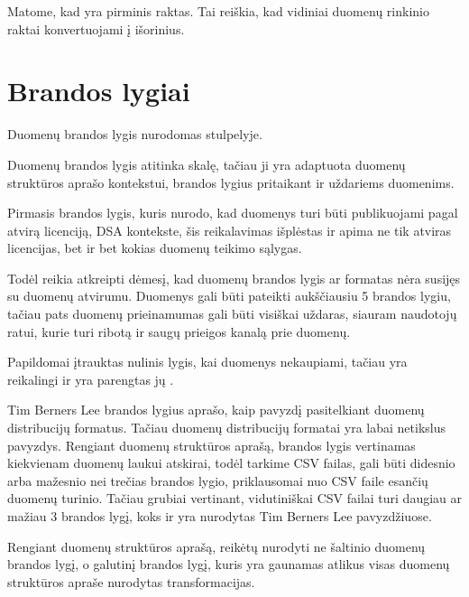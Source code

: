 \documentclass[letterpaper,10pt,lithuanian]{sphinxmanual}
\begin{document}
\sphinxAtStartPar
Matome, kad  yra  pirminis raktas. Tai reiškia, kad
vidiniai duomenų rinkinio raktai konvertuojami į išorinius.

\sphinxstepscope


\section{Brandos lygiai}
\label{\detokenize{branda:brandos-lygiai}}\label{\detokenize{branda:level}}\label{\detokenize{branda::doc}}
\sphinxAtStartPar
Duomenų brandos lygis nurodomas {\hyperref[\detokenize{formatas:level}]{}} stulpelyje.

\sphinxAtStartPar
Duomenų brandos lygis atitinka  skalę, tačiau ji yra adaptuota duomenų
struktūros aprašo kontekstui, brandos lygius pritaikant ir uždariems duomenims.

\sphinxAtStartPar
Pirmasis brandos lygis, kuris nurodo, kad duomenys turi būti publikuojami pagal
atvirą licenciją, DSA kontekste, šis reikalavimas išplėstas ir apima ne tik
atviras licencijas, bet ir bet kokias duomenų teikimo sąlygas.

\sphinxAtStartPar
Todėl reikia atkreipti dėmesį, kad duomenų brandos lygis ar formatas nėra
susijęs su duomenų atvirumu. Duomenys gali būti pateikti aukščiausiu 5 brandos
lygiu, tačiau pats duomenų prieinamumas gali būti visiškai uždaras, siauram
naudotojų ratui, kurie turi ribotą ir saugų prieigos kanalą prie duomenų.

\sphinxAtStartPar
Papildomai įtrauktas nulinis lygis, kai duomenys nekaupiami, tačiau yra
reikalingi ir yra parengtas jų {\hyperref[\detokenize{savokos:term-DSA}]{}}.

\sphinxAtStartPar
Tim Berners Lee brandos lygius aprašo, kaip pavyzdį pasitelkiant duomenų
distribucijų formatus. Tačiau duomenų distribucijų formatai yra labai
netikslus pavyzdys. Rengiant duomenų struktūros aprašą, brandos lygis
vertinamas kiekvienam duomenų laukui atskirai, todėl tarkime CSV failas, gali
būti didesnio arba mažesnio nei trečias brandos lygio, priklausomai nuo CSV
faile esančių duomenų turinio. Tačiau grubiai vertinant, vidutiniškai CSV
failai turi daugiau ar mažiau 3 brandos lygį, koks ir yra nurodytas Tim
Berners Lee pavyzdžiuose.

\sphinxAtStartPar
Rengiant duomenų struktūros aprašą, reikėtų nurodyti ne šaltinio duomenų
brandos lygį, o galutinį brandos lygį, kuris yra gaunamas atlikus visas
duomenų struktūros apraše nurodytas transformacijas.
\end{document}
